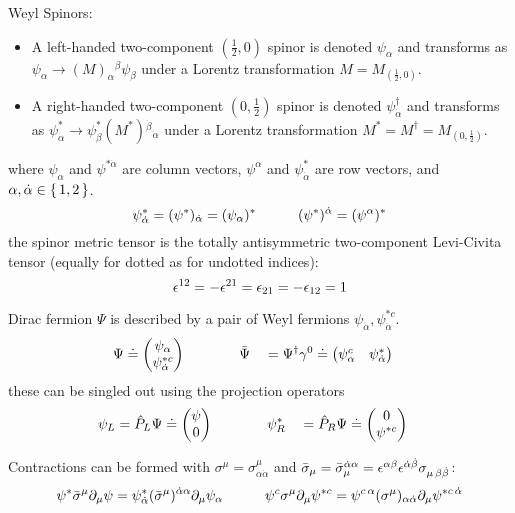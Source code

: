 			\noindent
			Weyl Spinors:
			\begin{itemize}
				\item A left-handed two-component $(\frac{1}{2},0)$ spinor is denoted $\psi_{\alpha}$ and transforms as $\psi_{\alpha} \to (M)_{\alpha}{}^{\beta} \psi_{\beta}$ under a Lorentz transformation $M=M_{(\frac{1}{2},0)}$.
				\item A right-handed two-component $(0,\frac{1}{2})$ spinor is denoted $\psi_{\dot{\alpha}}^\dagger$ and transforms as $\psi_{\dot{\alpha}}^{*} \to \psi_{\dot{\beta}}^{*} (M^{*}){}^{\dot{\beta}}{}_{\dot{\alpha}}$ under a Lorentz transformation $M^{*}=M^\dagger =M_{(0,\frac{1}{2})}$.
			\end{itemize}
			where $\psi_\alpha$ and $\psi^{{*}\dot{\alpha}}$ are column vectors, $\psi^\alpha$ and $\psi^{*}_{\dot{\alpha}}$ are row vectors, and $\alpha,\dot{\alpha}\in\set{1,2}$.
			\begin{equation}
				\psi^{*}_{\dot{\alpha}} = (\psi^{*})_{\dot{\alpha}} = (\psi_\alpha)^{*}
				\hspace{30pt}
				(\psi^{*})^{\dot{\alpha}} = (\psi^\alpha)^{*}
			\end{equation}
			the spinor metric tensor is the totally antisymmetric two-component Levi-Civita tensor (equally for dotted as for undotted indices):
			\begin{equation}
				\epsilon^{12} = - \epsilon^{21} = \epsilon_{21} = - \epsilon_{12} = 1
			\end{equation}

			\noindent
			Dirac fermion $\Psi$ is described by a pair of Weyl fermions $\psi_{\alpha}, \psi^{*c}_{\dot{\alpha}}$.
			\begin{alignat}{3}
				\Psi &\doteq \mqty(\psi_{\alpha} \\ \psi^{*c}_{\dot{\alpha}})
				\hsp &&
				\bar{\Psi} &&= \Psi^\dagger\gamma^0 \doteq \mqty(\psi^c_{\alpha} & \psi^{*}_{\dot{\alpha}})
			\end{alignat}
			these can be singled out using the projection operators
			\begin{alignat}{3}
				\psi_L &= \hat{P}_L \Psi \doteq \mqty(\psi \\ 0)
				\hsp &&
				\psi_R^{*} &&= \hat{P}_R \Psi \doteq \mqty(0 \\ \psi^{*c})
			\end{alignat}

			\noindent
			Contractions can be formed with $\sigma^\mu=\sigma^\mu_{\alpha\dot{\alpha}}$ and $\bar{\sigma}_\mu=\bar{\sigma}_\mu^{\dot{\alpha}\alpha} = \epsilon^{\alpha\beta}\epsilon^{\dot{\alpha}\dot{\beta}}\sigma_{\mu\,\beta\dot{\beta}}$:
			\begin{equation}
				\psi^{*} \bar{\sigma}^\mu \partial_\mu \psi = \psi^{*}_{\dot{\alpha}} (\bar{\sigma}^\mu)^{\dot{\alpha}\alpha}\partial_\mu \psi_{\alpha}
				\hspace{30pt} \psi^c \sigma^\mu \partial_\mu \psi^{*c} = \psi^{c\,\alpha} (\sigma^\mu)_{\alpha\dot{\alpha}}\partial_\mu \psi^{*c\,\dot{\alpha}}
			\end{equation}

